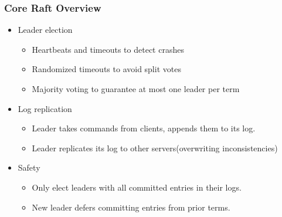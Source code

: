 \begin{frame}
    \frametitle{Core Raft Overview}
    \begin{itemize}
        \item Leader election
            \begin{itemize}
                \item Heartbeats and timeouts to detect crashes
                \item Randomized timeouts to avoid split votes
                \item Majority voting to guarantee at most one leader per term
            \end{itemize}
        \item Log replication
            \begin{itemize}
                \item Leader takes commands from clients, appends them to its log.
                \item Leader replicates its log to other servers(overwriting inconsistencies)
            \end{itemize}
        \item Safety
            \begin{itemize}
                \item Only elect leaders with all committed entries in their logs.
                \item New leader defers committing entries from prior terms.
            \end{itemize}
    \end{itemize}
\end{frame}

